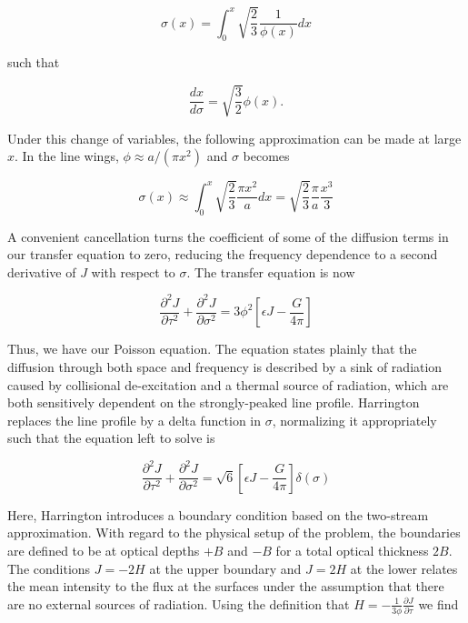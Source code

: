 \documentclass[onecolumn]{aastex63}
\begin{document}
\begin{equation}
    \sigma(x) = \int_0^x \sqrt{\frac{2}{3}}\frac{1}{\phi(x)}dx
\end{equation}

\noindent such that

\begin{equation}
    \frac{dx}{d\sigma} = \sqrt{\frac{3}{2}}\phi(x).
\end{equation}

\noindent Under this change of variables, the following approximation can be made at large $x$. In the line wings, $\phi \approx a/(\pi x^2)$ and $\sigma$ becomes

\begin{equation}
    \sigma(x) \approx \int_0^x \sqrt{\frac{2}{3}}\frac{\pi x^2}{a}dx = \sqrt{\frac{2}{3}} \frac{\pi}{a}\frac{x^3}{3}
\end{equation}

\noindent A convenient cancellation turns the coefficient of some of the diffusion terms in our transfer equation to zero, reducing the frequency dependence to a second derivative of $J$ with respect to $\sigma$. The transfer equation is now

\begin{equation}
    \frac{\partial^2J}{\partial \tau ^2} + \frac{\partial ^2 J}{\partial \sigma^2} = 3\phi^2 \left[\epsilon J - \frac{G}{4\pi}\right]
\end{equation}

\noindent Thus, we have our Poisson equation. The equation states plainly that the diffusion through both space and frequency is described by a sink of radiation caused by collisional de-excitation and a thermal source of radiation, which are both sensitively dependent on the strongly-peaked line profile. Harrington replaces the line profile by a delta function in $\sigma$, normalizing it appropriately such that the equation left to solve is 

\begin{equation}
    \frac{\partial^2J}{\partial \tau ^2} + \frac{\partial ^2 J}{\partial \sigma^2} = \sqrt{6} \left[\epsilon J - \frac{G}{4\pi}\right]\delta(\sigma)
\end{equation}

Here, Harrington introduces a boundary condition based on the two-stream approximation. With regard to the physical setup of the problem, the boundaries are defined to be at optical depths $+B$ and $-B$ for a total optical thickness $2B$. The conditions $J=-2H$ at the upper boundary and $J=2H$ at the lower relates the mean intensity to the flux at the surfaces under the assumption that there are no external sources of radiation. Using the definition that $H = -\frac{1}{3\phi}\frac{\partial J}{\partial \tau}$ we find
\end{document}
